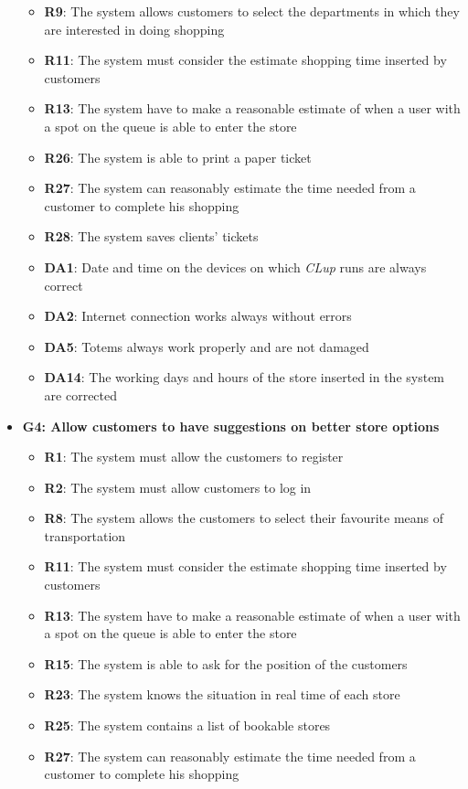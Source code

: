 \documentclass{article}
\begin{document}
\begin{itemize}
					\begin{itemize}
						
						\item {\bfseries R9}: The system allows customers to select the departments in which they are interested in doing shopping
						\item {\bfseries R11}: The system must consider the estimate shopping time inserted by customers
						\item {\bfseries R13}: The system have to make a reasonable estimate of when a user with a spot on the queue is able to enter the store
						\item {\bfseries R26}: The system is able to print a paper ticket
						\item {\bfseries R27}: The system can reasonably estimate the time needed from a customer to complete his shopping
						\item {\bfseries R28}: The system saves clients' tickets \\
						
						\item {\bfseries DA1}: Date and time on the devices on which \emph{CLup} runs are always correct
						\item {\bfseries DA2}: Internet connection works always without errors
						\item {\bfseries DA5}: Totems always work properly and are not damaged
						\item {\bfseries DA14}: The working days and hours of the store inserted in the system are corrected
						
					\end{itemize}

				\item {\bfseries G4: Allow customers to have suggestions on better store options}	

					\begin{itemize}
						
						\item {\bfseries R1}: The system must allow the customers to register
						\item {\bfseries R2}: The system must allow customers to log in
						\item {\bfseries R8}: The system allows the customers to select their favourite means of transportation
						\item {\bfseries R11}: The system must consider the estimate shopping time inserted by customers
						\item {\bfseries R13}: The system have to make a reasonable estimate of when a user with a spot on the queue is able to enter the store
						\item {\bfseries R15}: The system is able to ask for the position of the customers
						\item {\bfseries R23}: The system knows the situation in real time of each store
						\item {\bfseries R25}: The system contains a list of bookable stores
						\item {\bfseries R27}: The system can reasonably estimate the time needed from a customer to complete his shopping	\\
		

\end{itemize}
\end{itemize}
\end{document}
